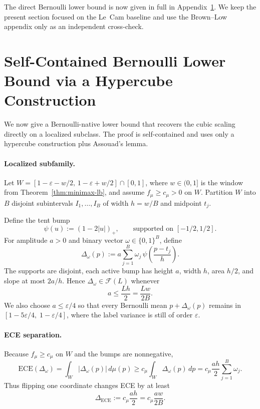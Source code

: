 \documentclass{article}
\newcommand{\ECE}{\mathrm{ECE}}
\newcommand{\cF}{\mathcal{F}}
\newcommand{\Lip}{L}
\newcommand{\errrate}{\varepsilon}
\newcommand{\calmap}{\Delta}
\newcommand{\scoredist}{\mu}
\theoremstyle{definition}
\begin{document}
The direct Bernoulli lower bound is now given in full in Appendix~\ref{app:bernoulli_lb}. We keep the present section focused on the Le~Cam baseline and use the Brown--Low appendix only as an independent cross-check.

\section{Self-Contained Bernoulli Lower Bound via a Hypercube Construction}
\label{app:bernoulli_lb}

We now give a Bernoulli-native lower bound that recovers the cubic scaling directly on a localized subclass. The proof is self-contained and uses only a hypercube construction plus Assouad's lemma.

\paragraph{Localized subfamily.} Let $W = [1-\errrate-w/2,\,1-\errrate+w/2]\cap[0,1]$, where $w \in (0,1]$ is the window from Theorem~\ref{thm:minimax-lb}, and assume $f_\scoredist \ge c_\scoredist > 0$ on $W$. Partition $W$ into $B$ disjoint subintervals $I_1,\dots,I_B$ of width $h=w/B$ and midpoint $t_j$.

Define the tent bump
\[
\psi(u) := (1-2|u|)_+, \qquad \text{supported on } [-1/2,1/2].
\]
For amplitude $a>0$ and binary vector $\omega \in \{0,1\}^B$, define
\[
\calmap_\omega(p) := a \sum_{j=1}^B \omega_j\, \psi\!\left(\frac{p-t_j}{h}\right).
\]
The supports are disjoint, each active bump has height $a$, width $h$, area $h/2$, and slope at most $2a/h$. Hence $\calmap_\omega \in \cF(\Lip)$ whenever
\begin{equation}
\label{eq:lip-constraint}
a \le \frac{\Lip h}{2} = \frac{\Lip w}{2B}.
\end{equation}
We also choose $a \le \errrate/4$ so that every Bernoulli mean $p+\calmap_\omega(p)$ remains in $[1-5\errrate/4,\;1-\errrate/4]$, where the label variance is still of order $\errrate$.

\paragraph{ECE separation.} Because $f_\scoredist \ge c_\scoredist$ on $W$ and the bumps are nonnegative,
\[
\ECE(\calmap_\omega)
= \int_W |\calmap_\omega(p)|\,d\scoredist(p)
\ge c_\scoredist \int_W \calmap_\omega(p)\,dp
= c_\scoredist \frac{ah}{2}\sum_{j=1}^B \omega_j.
\]
Thus flipping one coordinate changes ECE by at least
\begin{equation}
\label{eq:ece-step}
\Delta_{\ECE} := c_\scoredist \frac{ah}{2} = c_\scoredist \frac{aw}{2B}.
\end{equation}
\end{document}

